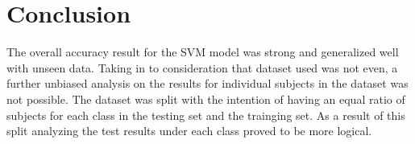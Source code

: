\section{Conclusion}
The overall accuracy result for the SVM model was strong and generalized well with unseen data. Taking in to consideration that dataset used was not even, a further unbiased analysis on the results for individual subjects in the dataset was not possible. The dataset was split with the intention of having an equal ratio of subjects for each class in the testing set and the trainging set. As a result of this split analyzing the test results under each class proved to be more logical.








